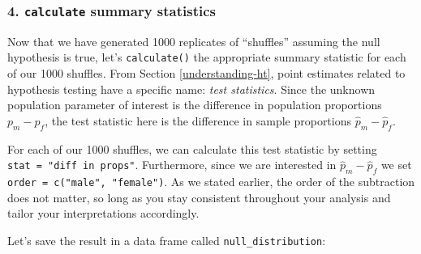 \documentclass[
]{book}
\newenvironment{Shaded}{\begin{snugshade}}{\end{snugshade}}
\newcommand{\DataTypeTok}[1]{\textcolor[rgb]{0.13,0.29,0.53}{#1}}
\newcommand{\DecValTok}[1]{\textcolor[rgb]{0.00,0.00,0.81}{#1}}
\newcommand{\KeywordTok}[1]{\textcolor[rgb]{0.13,0.29,0.53}{\textbf{#1}}}
\newcommand{\NormalTok}[1]{#1}
\newcommand{\OperatorTok}[1]{\textcolor[rgb]{0.81,0.36,0.00}{\textbf{#1}}}
\newcommand{\StringTok}[1]{\textcolor[rgb]{0.31,0.60,0.02}{#1}}
\begin{document}
\hypertarget{calculate-summary-statistics}{%
\subsubsection*{\texorpdfstring{4. \texttt{calculate} summary statistics}{4. calculate summary statistics}}\label{calculate-summary-statistics}}

Now that we have generated 1000 replicates of ``shuffles'' assuming the null hypothesis is true, let's \texttt{calculate()}  the appropriate summary statistic for each of our 1000 shuffles. From Section \ref{understanding-ht}, point estimates related to hypothesis testing have a specific name: \emph{test statistics}. Since the unknown population parameter of interest is the difference in population proportions \(p_{m} - p_{f}\), the test statistic here is the difference in sample proportions \(\widehat{p}_{m} - \widehat{p}_{f}\).

For each of our 1000 shuffles, we can calculate this test statistic by setting \texttt{stat\ =\ "diff\ in\ props"}. Furthermore, since we are interested in \(\widehat{p}_{m} - \widehat{p}_{f}\) we set \texttt{order\ =\ c("male",\ "female")}. As we stated earlier, the order of the subtraction does not matter, so long as you stay consistent throughout your analysis and tailor your interpretations accordingly.

Let's save the result in a data frame called \texttt{null\_distribution}:

\begin{Shaded}
\end{Shaded}
\end{document}

